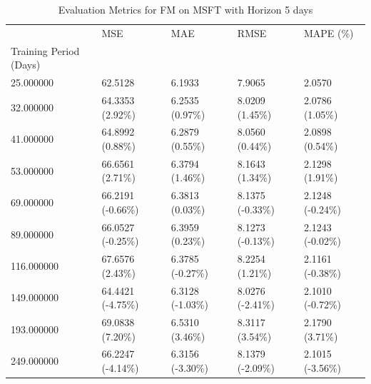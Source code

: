 \begin{table}
\caption{Evaluation Metrics for FM on MSFT with Horizon 5 days}
\label{tab:fm_MSFT_h5_metrics}
\begin{tabular}{lllll}
\toprule
 & MSE & MAE & RMSE & MAPE (\%) \\
Training Period (Days) &  &  &  &  \\
\midrule
25.000000 & 62.5128 & 6.1933 & 7.9065 & 2.0570 \\
32.000000 & 64.3353 (2.92\%) & 6.2535 (0.97\%) & 8.0209 (1.45\%) & 2.0786 (1.05\%) \\
41.000000 & 64.8992 (0.88\%) & 6.2879 (0.55\%) & 8.0560 (0.44\%) & 2.0898 (0.54\%) \\
53.000000 & 66.6561 (2.71\%) & 6.3794 (1.46\%) & 8.1643 (1.34\%) & 2.1298 (1.91\%) \\
69.000000 & 66.2191 (-0.66\%) & 6.3813 (0.03\%) & 8.1375 (-0.33\%) & 2.1248 (-0.24\%) \\
89.000000 & 66.0527 (-0.25\%) & 6.3959 (0.23\%) & 8.1273 (-0.13\%) & 2.1243 (-0.02\%) \\
116.000000 & 67.6576 (2.43\%) & 6.3785 (-0.27\%) & 8.2254 (1.21\%) & 2.1161 (-0.38\%) \\
149.000000 & 64.4421 (-4.75\%) & 6.3128 (-1.03\%) & 8.0276 (-2.41\%) & 2.1010 (-0.72\%) \\
193.000000 & 69.0838 (7.20\%) & 6.5310 (3.46\%) & 8.3117 (3.54\%) & 2.1790 (3.71\%) \\
249.000000 & 66.2247 (-4.14\%) & 6.3156 (-3.30\%) & 8.1379 (-2.09\%) & 2.1015 (-3.56\%) \\
\bottomrule
\end{tabular}
\end{table}
